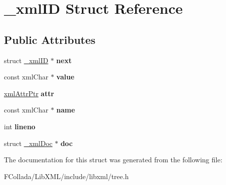 \hypertarget{struct__xmlID}{
\section{\_\-xmlID Struct Reference}
\label{struct__xmlID}
}
\subsection*{Public Attributes}
\begin{DoxyCompactItemize}
\item 
\hypertarget{struct__xmlID_aecf98546a7f6fa18529f744729c8c5be}{
struct \hyperlink{struct__xmlID}{\_\-xmlID} $\ast$ {\bfseries next}}
\label{struct__xmlID_aecf98546a7f6fa18529f744729c8c5be}

\item 
\hypertarget{struct__xmlID_a3adb7dbd11f6592ea3cf01a96d2b62b9}{
const xmlChar $\ast$ {\bfseries value}}
\label{struct__xmlID_a3adb7dbd11f6592ea3cf01a96d2b62b9}

\item 
\hypertarget{struct__xmlID_a0273ce499877771549f91b374bfb6f95}{
\hyperlink{struct__xmlAttr}{xmlAttrPtr} {\bfseries attr}}
\label{struct__xmlID_a0273ce499877771549f91b374bfb6f95}

\item 
\hypertarget{struct__xmlID_aad1ef0c2cce7d2e038499f14441493d1}{
const xmlChar $\ast$ {\bfseries name}}
\label{struct__xmlID_aad1ef0c2cce7d2e038499f14441493d1}

\item 
\hypertarget{struct__xmlID_a108740dc154fd8bfedb996e6a2de419e}{
int {\bfseries lineno}}
\label{struct__xmlID_a108740dc154fd8bfedb996e6a2de419e}

\item 
\hypertarget{struct__xmlID_a166cadc7fb387fbad987b030095f91a4}{
struct \hyperlink{struct__xmlDoc}{\_\-xmlDoc} $\ast$ {\bfseries doc}}
\label{struct__xmlID_a166cadc7fb387fbad987b030095f91a4}

\end{DoxyCompactItemize}


The documentation for this struct was generated from the following file:\begin{DoxyCompactItemize}
\item 
FCollada/LibXML/include/libxml/tree.h\end{DoxyCompactItemize}
